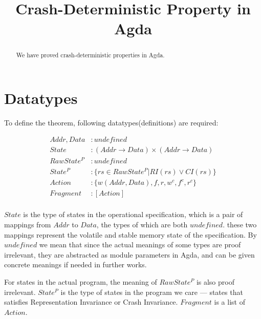\documentclass[a4paper,11pt]{article}
\theoremstyle{definition}
\begin{document}
	
\title{Crash-Deterministic Property in Agda}
\maketitle

\begin{abstract}
	We have proved crash-deterministic properties in Agda.
\end{abstract}


\section{Datatypes}

To define the theorem, following datatypes(definitions) are required:

\begin{align*}
	\mathit{Addr}, \mathit{Data} &: \mathit{undefined}\\
	\mathit{State} &: (Addr \to Data) \times (Addr \to Data)\\
	\mathit{RawState^P} &: \mathit{undefined}\\
	\mathit{State^P} &: \{ \mathit{rs} \in \mathit{RawState^P} | \mathit{RI(rs) \lor CI(rs)} \}\\
	\mathit{Action} &: \{w(Addr, Data), f, r, w^c, f^c, r^c\}\\
	\mathit{Fragment} &: [\mathit{Action}]\\
\end{align*}

$\mathit{State}$ is the type of states in the operational specification, which is a pair of mappings from $Addr$ to $Data$, the types of which are both $\mathit{undefined}$. these two mappings represent the volatile and stable memory state of the specification.  By $\mathit{undefined}$ we mean that since the actual meanings of some types are proof irrelevant, they are abstracted as module parameters in Agda, and can be given concrete meanings if needed in further works. 

For states in the actual program, the meaning of $\mathit{RawState^P}$ is also proof irrelevant. $\mathit{State^P}$ is the type of states in the program we care \---- states that satisfies Representation Invariance or Crash Invariance. $\mathit{Fragment}$ is a list of $\mathit{Action}$.
\end{document}
